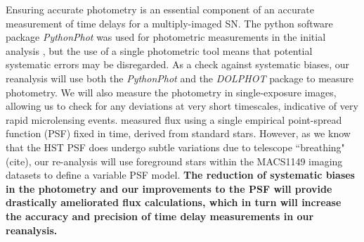 Ensuring accurate photometry is an essential component of an accurate measurement of time delays for a multiply-imaged SN. 
The python software package \textit{PythonPhot} \citep{Jones:2015} was used for photometric measurements in the initial analysis
\citep{Rodney:2016}, but the use of a single photometric tool means that potential systematic errors may be disregarded. 
As a check against systematic biases, our reanalysis will use both the \textit{PythonPhot} and the \textit{DOLPHOT} package to 
measure photometry. We will also measure the photometry in single-exposure images, allowing us to check for any deviations 
at very short timescales, indicative of very rapid microlensing events. \cite{Rodney:2016} measured flux using a single empirical 
point-spread function (PSF) fixed in time, derived from standard stars. However, as we know that the HST PSF does undergo 
subtle variations due to telescope ``breathing" (cite), our re-analysis will use foreground stars within the MACS1149 imaging 
datasets to define a variable PSF model. \textbf{The reduction of systematic biases in the photometry and our improvements to the 
PSF will provide drastically ameliorated flux calculations, which in turn will increase the accuracy and precision of time delay 
measurements in our reanalysis.}




